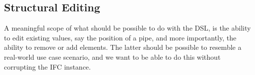 \subsection{Structural Editing}
A meaningful scope of what should be possible to do with the DSL, is the ability to edit existing values, say the position of a pipe, and more importantly, the ability to remove or add elements. The latter should be possible to resemble a real-world use case scenario, and we want to be able to do this without corrupting the IFC instance.


